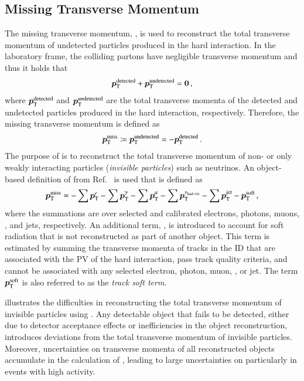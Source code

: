 \subsection{Missing Transverse Momentum}%
\label{sec:atlas_met}

The missing transverse momentum, \pTmiss, is used to reconstruct the total
transverse momentum of undetected particles produced in the hard interaction. In
the laboratory frame, the colliding partons have negligible transverse momentum
and thus it holds that
\begin{align*}
  \bm{p}_{\text{T}}^{\text{detected}} + \bm{p}_{\text{T}}^{\text{undetected}} = \bm{0} \,\text{,}
\end{align*}
where $\bm{p}_{\text{T}}^{\text{detected}}$ and
$\bm{p}_{\text{T}}^{\text{undetected}}$ are the total transverse momenta of
the detected and undetected particles produced in the hard interaction,
respectively. Therefore, the missing transverse momentum is defined as
\begin{align*}
  \bm{p}_{\text{T}}^{\text{miss}}
  \coloneqq \bm{p}_{\text{T}}^{\text{undetected}}
  = -\bm{p}_{\text{T}}^{\text{detected}} \,\text{.}
\end{align*}
The purpose of \pTmiss is to reconstruct the total transverse momentum of non-
or only weakly interacting particles (\emph{invisible particles}) such as
neutrinos. An object-based definition of \pTmiss from Ref.~\cite{PERF-2016-07}
is used that is defined as
\begin{align}
  \bm{p}_{\text{T}}^{\text{miss}} =
  - \sum \bm{p}_{\text{T}}^{e}
  - \sum \bm{p}_{\text{T}}^{\gamma}
  - \sum \bm{p}_{\text{T}}^{\mu}
  - \sum \bm{p}_{\text{T}}^{\tau_{\text{had-vis}}}
  - \sum \bm{p}_{\text{T}}^{\text{jet}}
  - \bm{p}_{\text{T}}^{\text{soft}}
  \,\text{,}
  \label{eq:met}
\end{align}
where the summations are over selected and calibrated electrons, photons, muons,
\tauhadvis, and jets, respectively. An additional term, , is
introduced to account for soft radiation that is not reconstructed as part of
another object. This term is estimated by summing the transverse momenta of
tracks in the ID that are associated with the PV of the hard interaction, pass
track quality criteria, and cannot be associated with any selected electron,
photon, muon, \tauhadvis, or jet. The term $\bm{p}_{\text{T}}^{\text{soft}}$ is also
referred to as the \emph{track soft term}.

 illustrates the difficulties in reconstructing the total
transverse momentum of invisible particles using \pTmiss. Any detectable object
that fails to be detected, either due to detector acceptance effects or
inefficiencies in the object reconstruction, introduces deviations from the
total transverse momentum of invisible particles. Moreover, uncertainties on
transverse momenta of all reconstructed objects accumulate in the calculation of
\pTmiss, leading to large uncertainties on \pTmiss particularly in events with
high activity.

